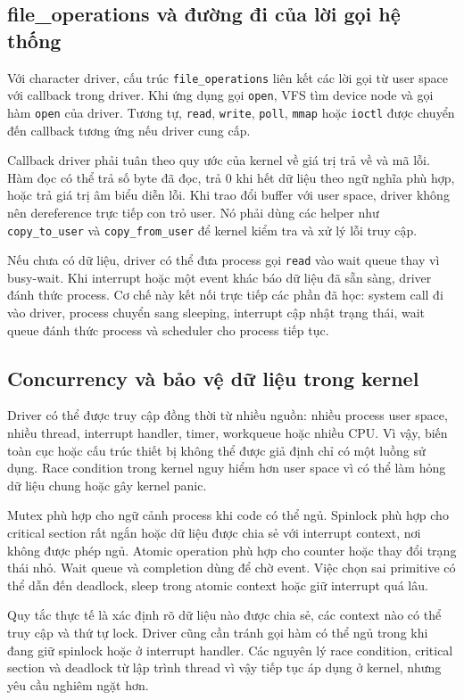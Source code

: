 \documentclass[11pt]{article}
\newcommand{\code}[1]{\texttt{#1}}
\begin{document}
\subsection{file\_operations và đường đi của lời gọi hệ thống}

Với character driver, cấu trúc \code{file\_operations} liên kết các lời gọi từ user space với callback trong driver. Khi ứng dụng gọi \code{open}, VFS tìm device node và gọi hàm \code{open} của driver. Tương tự, \code{read}, \code{write}, \code{poll}, \code{mmap} hoặc \code{ioctl} được chuyển đến callback tương ứng nếu driver cung cấp.

Callback driver phải tuân theo quy ước của kernel về giá trị trả về và mã lỗi. Hàm đọc có thể trả số byte đã đọc, trả 0 khi hết dữ liệu theo ngữ nghĩa phù hợp, hoặc trả giá trị âm biểu diễn lỗi. Khi trao đổi buffer với user space, driver không nên dereference trực tiếp con trỏ user. Nó phải dùng các helper như \code{copy\_to\_user} và \code{copy\_from\_user} để kernel kiểm tra và xử lý lỗi truy cập.

Nếu chưa có dữ liệu, driver có thể đưa process gọi \code{read} vào wait queue thay vì busy-wait. Khi interrupt hoặc một event khác báo dữ liệu đã sẵn sàng, driver đánh thức process. Cơ chế này kết nối trực tiếp các phần đã học: system call đi vào driver, process chuyển sang sleeping, interrupt cập nhật trạng thái, wait queue đánh thức process và scheduler cho process tiếp tục.

\subsection{Concurrency và bảo vệ dữ liệu trong kernel}

Driver có thể được truy cập đồng thời từ nhiều nguồn: nhiều process user space, nhiều thread, interrupt handler, timer, workqueue hoặc nhiều CPU. Vì vậy, biến toàn cục hoặc cấu trúc thiết bị không thể được giả định chỉ có một luồng sử dụng. Race condition trong kernel nguy hiểm hơn user space vì có thể làm hỏng dữ liệu chung hoặc gây kernel panic.

Mutex phù hợp cho ngữ cảnh process khi code có thể ngủ. Spinlock phù hợp cho critical section rất ngắn hoặc dữ liệu được chia sẻ với interrupt context, nơi không được phép ngủ. Atomic operation phù hợp cho counter hoặc thay đổi trạng thái nhỏ. Wait queue và completion dùng để chờ event. Việc chọn sai primitive có thể dẫn đến deadlock, sleep trong atomic context hoặc giữ interrupt quá lâu.

Quy tắc thực tế là xác định rõ dữ liệu nào được chia sẻ, các context nào có thể truy cập và thứ tự lock. Driver cũng cần tránh gọi hàm có thể ngủ trong khi đang giữ spinlock hoặc ở interrupt handler. Các nguyên lý race condition, critical section và deadlock từ lập trình thread vì vậy tiếp tục áp dụng ở kernel, nhưng yêu cầu nghiêm ngặt hơn.
\end{document}
